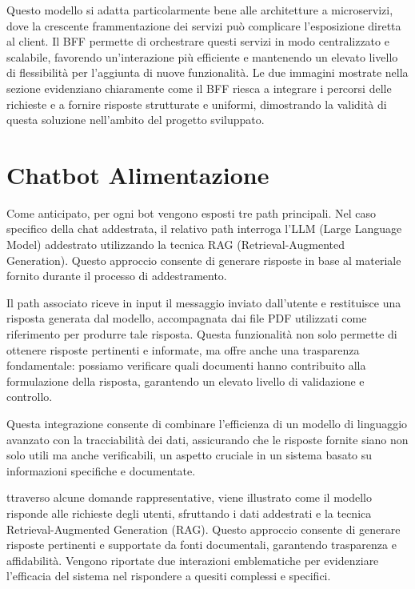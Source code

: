\documentclass[a4paper,twoside,12pt]{toptesi}
\begin{document}
Questo modello si adatta particolarmente bene alle architetture a microservizi, dove la crescente frammentazione dei servizi può complicare l'esposizione diretta al client. Il BFF permette di orchestrare questi servizi in modo centralizzato e scalabile, favorendo un'interazione più efficiente e mantenendo un elevato livello di flessibilità per l'aggiunta di nuove funzionalità. Le due immagini mostrate nella sezione evidenziano chiaramente come il BFF riesca a integrare i percorsi delle richieste e a fornire risposte strutturate e uniformi, dimostrando la validità di questa soluzione nell'ambito del progetto sviluppato.

\section{Chatbot Alimentazione}


Come anticipato, per ogni bot vengono esposti tre path principali. Nel caso specifico della chat addestrata, il relativo path interroga l'LLM (Large Language Model) addestrato utilizzando la tecnica RAG (Retrieval-Augmented Generation). Questo approccio consente di generare risposte in base al materiale fornito durante il processo di addestramento.

Il path associato riceve in input il messaggio inviato dall'utente e restituisce una risposta generata dal modello, accompagnata dai file PDF utilizzati come riferimento per produrre tale risposta. Questa funzionalità non solo permette di ottenere risposte pertinenti e informate, ma offre anche una trasparenza fondamentale: possiamo verificare quali documenti hanno contribuito alla formulazione della risposta, garantendo un elevato livello di validazione e controllo.

Questa integrazione consente di combinare l'efficienza di un modello di linguaggio avanzato con la tracciabilità dei dati, assicurando che le risposte fornite siano non solo utili ma anche verificabili, un aspetto cruciale in un sistema basato su informazioni specifiche e documentate.

ttraverso alcune domande rappresentative, viene illustrato come il modello risponde alle richieste degli utenti, sfruttando i dati addestrati e la tecnica Retrieval-Augmented Generation (RAG). Questo approccio consente di generare risposte pertinenti e supportate da fonti documentali, garantendo trasparenza e affidabilità. Vengono riportate due interazioni emblematiche per evidenziare l'efficacia del sistema nel rispondere a quesiti complessi e specifici.
\end{document}

